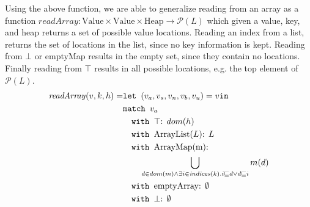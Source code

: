 Using the above function, we are able to generalize reading from an array as a function $\mathit{readArray}: \text{Value} \times \text{Value} \times \text{Heap} \rightarrow \mathcal{P}(L)$ which given a value, key, and heap returns a set of possible value locations. Reading an index from a list, returns the set of locations in the list, since no key information is kept. Reading from $\bot$ or { emptyMap} results in the empty set, since they contain no locations. Finally reading from $\top$ results in all possible locations, e.g. the top element of $\mathcal{P}(L)$.
\begin{align}
\mathit{readArray}(v,k,h) =            &\texttt{let } (v_a,v_s,v_n,v_b,v_u) = v \texttt{in }\notag\\
                            &\texttt{match }v_a\notag\\
                            &\quad\texttt{with }\top\text{: } dom(h) \notag\\
                            &\quad\texttt{with }\text{ArrayList}(L)\text{: } L \notag\\
                            &\quad\texttt{with }\text{ArrayMap(m)}\text{: } \notag\\
                            & \quad\quad \bigcup_{d \in dom(m) \wedge \exists i \in \mathit{indices}(k).i\sqsubseteq d \vee d \sqsubseteq i } m(d)\notag\\
                            &\quad\texttt{with }\text{emptyArray}\text{: } \emptyset \notag\\
                            &\quad\texttt{with }\bot\text{: } \emptyset
\end{align}

